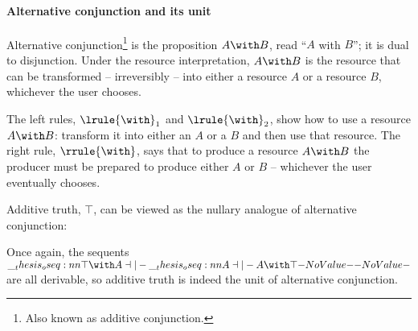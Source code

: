 \paragraph{Alternative conjunction and its unit}
Alternative conjunction\footnote{Also known as additive conjunction.} is the proposition $A \with B$, read \enquote{$A$ with $B$};
it is dual to disjunction.
Under the resource interpretation, $A \with B$ is the resource that can be transformed -- irreversibly -- into either a resource $A$ or a resource $B$, whichever the user chooses.
The left rules, $\lrule{\with}_1$ and $\lrule{\with}_2$, show how to use a resource $A \with B$: transform it into either an $A$ or a $B$ and then use that resource.
The right rule, $\rrule{\with}$, says that to produce a resource $A \with B$ the producer must be prepared to produce either $A$ or $B$ -- whichever the user eventually chooses.

Additive truth, $\top$, can be viewed as the nullary analogue of alternative conjunction:
Once again, the sequents $\oseq{\top \with A \dashv|- \oseq{A \dashv|- A \with \top}}$ are all derivable, so additive truth is indeed the unit of alternative conjunction.



